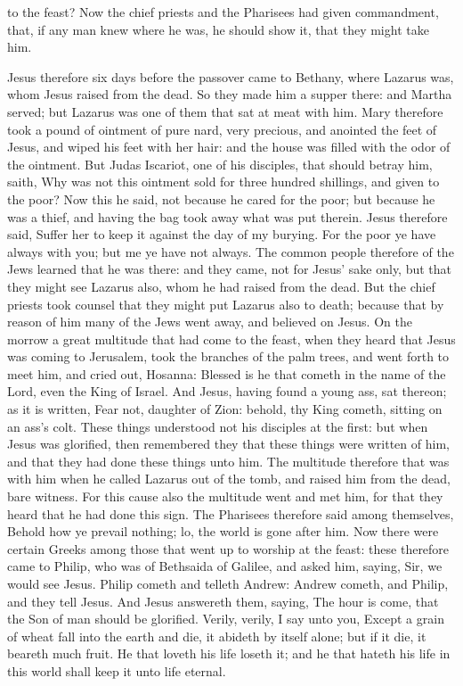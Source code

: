 to the feast? Now the chief priests and the Pharisees had given commandment, that, if any man knew where he was, he should show it, that they might take him. 

Jesus therefore six days before the passover came to Bethany, where Lazarus was, whom Jesus raised from the dead. So they made him a supper there: and Martha served; but Lazarus was one of them that sat at meat with him. Mary therefore took a pound of ointment of pure nard, very precious, and anointed the feet of Jesus, and wiped his feet with her hair: and the house was filled with the odor of the ointment. But Judas Iscariot, one of his disciples, that should betray him, saith, Why was not this ointment sold for three hundred shillings, and given to the poor? Now this he said, not because he cared for the poor; but because he was a thief, and having the bag took away what was put therein. Jesus therefore said, Suffer her to keep it against the day of my burying. For the poor ye have always with you; but me ye have not always.  The common people therefore of the Jews learned that he was there: and they came, not for Jesus’ sake only, but that they might see Lazarus also, whom he had raised from the dead. But the chief priests took counsel that they might put Lazarus also to death; because that by reason of him many of the Jews went away, and believed on Jesus.  On the morrow a great multitude that had come to the feast, when they heard that Jesus was coming to Jerusalem, took the branches of the palm trees, and went forth to meet him, and cried out, Hosanna: Blessed is he that cometh in the name of the Lord, even the King of Israel. And Jesus, having found a young ass, sat thereon; as it is written, Fear not, daughter of Zion: behold, thy King cometh, sitting on an ass’s colt. These things understood not his disciples at the first: but when Jesus was glorified, then remembered they that these things were written of him, and that they had done these things unto him. The multitude therefore that was with him when he called Lazarus out of the tomb, and raised him from the dead, bare witness. For this cause also the multitude went and met him, for that they heard that he had done this sign. The Pharisees therefore said among themselves, Behold how ye prevail nothing; lo, the world is gone after him.  Now there were certain Greeks among those that went up to worship at the feast: these therefore came to Philip, who was of Bethsaida of Galilee, and asked him, saying, Sir, we would see Jesus. Philip cometh and telleth Andrew: Andrew cometh, and Philip, and they tell Jesus. And Jesus answereth them, saying, The hour is come, that the Son of man should be glorified. Verily, verily, I say unto you, Except a grain of wheat fall into the earth and die, it abideth by itself alone; but if it die, it beareth much fruit. He that loveth his life loseth it; and he that hateth his life in this world shall keep it unto life eternal. 